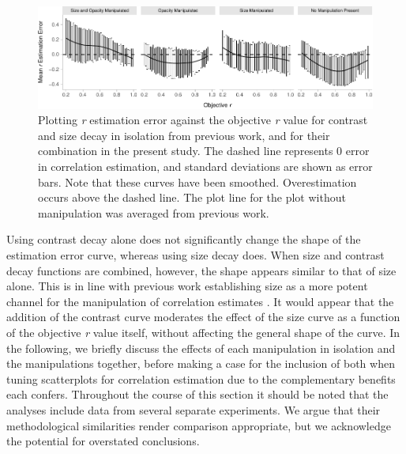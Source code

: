\documentclass[manuscript, review, anonymous, screen]{acmart}
\begin{document}
\begin{figure}

{\centering \includegraphics[width=1\textwidth,height=\textheight]{size_and_opacity_files/figure-pdf/fig-est-multi-exp-1.pdf}

}

\caption{\label{fig-est-multi-exp}Plotting \emph{r} estimation error
against the objective \emph{r} value for contrast and size decay in
isolation from previous work, and for their combination in the present
study. The dashed line represents 0 error in correlation estimation, and
standard deviations are shown as error bars. Note that these curves have
been smoothed. Overestimation occurs above the dashed line. The plot
line for the plot without manipulation was averaged from previous work.}

\end{figure}

Using contrast decay alone does not significantly change the shape of
the estimation error curve, whereas using size decay does. When size and
contrast decay functions are combined, however, the shape appears
similar to that of size alone. This is in line with previous work
establishing size as a more potent channel for the manipulation of
correlation estimates \citep{strain_2023b}. It would appear that the
addition of the contrast curve moderates the effect of the size curve as
a function of the objective \emph{r} value itself, without affecting the
general shape of the curve. In the following, we briefly discuss the
effects of each manipulation in isolation and the manipulations
together, before making a case for the inclusion of both when tuning
scatterplots for correlation estimation due to the complementary
benefits each confers. Throughout the course of this section it should
be noted that the analyses include data from several separate
experiments. We argue that their methodological similarities render
comparison appropriate, but we acknowledge the potential for overstated
conclusions.
\end{document}

